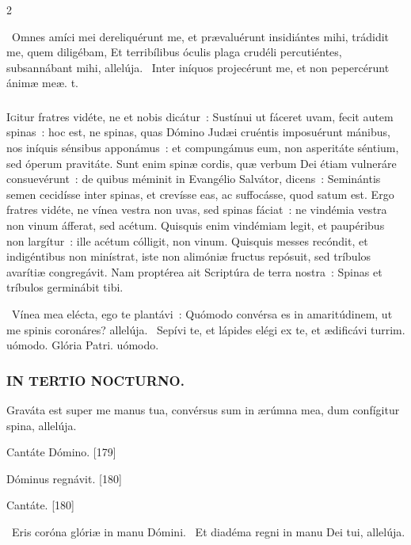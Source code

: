 \documentclass[9pt,twoside]{extarticle}
\begin{document}
\begin{multicols}{2}
{{\begin{tightlist}{}
\item {}~Omnes amíci mei dereliquérunt me, et prævaluérunt insidiántes mihi, trádidit me, quem diligébam, \textred{*} Et terribílibus óculis plaga crudéli percutiéntes, subsannábant mihi, allelúja. ~Inter iníquos projecérunt me, et non pepercérunt ánimæ meæ. t.
\end{tightlist}

\subsubsection*{\center {}}
\lettrine{I}gitur fratres vidéte, ne et nobis dicátur~: Sustínui ut fáceret uvam, fecit autem spinas~: hoc est, ne spinas, quas Dómino Judæi cruéntis imposuérunt mánibus, nos iníquis sénsibus apponámus~: et compungámus eum, non asperitáte séntium, sed óperum pravitáte. Sunt enim spinæ cordis, quæ verbum Dei étiam vulneráre consuevérunt~: de quibus méminit in Evangélio Salvátor, dicens~: Seminántis semen cecidísse inter spinas, et crevísse eas, ac suffocásse, quod satum est. Ergo fratres vidéte, ne vínea vestra non uvas, sed spinas fáciat~: ne vindémia vestra non vinum áfferat, sed acétum. Quisquis enim vindémiam legit, et paupéribus non largítur~: ille acétum cólligit, non vinum. Quisquis messes recóndit, et indigéntibus non minístrat, iste non alimóniæ fructus repósuit, sed tríbulos avarítiæ congregávit. Nam proptérea ait Scriptúra de terra nostra~: Spinas et tríbulos germinábit tibi.

\begin{tightlist}{}
\item {}~Vínea mea elécta, ego te plantávi~: \textred{*} Quómodo convérsa es in amaritúdinem, ut me spinis coronáres? allelúja. ~Sepívi te, et lápides elégi ex te, et ædificávi turrim. uómodo. Glória Patri. uómodo.
\end{tightlist}

\subsubsection*{\center \textsc{IN TERTIO NOCTURNO.}}
\begin{tightlist}{}
\item {} Graváta est super me manus tua, convérsus sum in ærúmna mea, dum confígitur spina, allelúja.
\item {} Cantáte Dómino. [179] 
\item {} Dóminus regnávit. [180] 
\item {} Cantáte. [180]
\item {}~Eris coróna glóriæ in manu Dómini. ~Et diadéma regni in manu Dei tui, allelúja.
\end{tightlist}

}}
\end{multicols}
\end{document}
